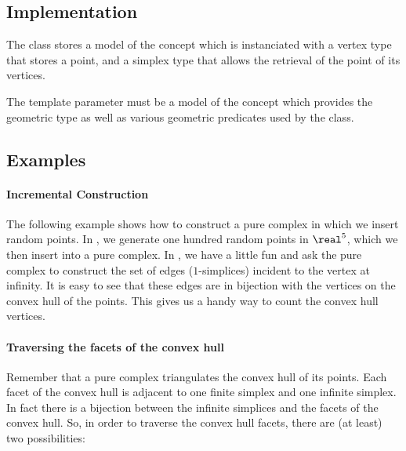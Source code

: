 {{%

\subsection{Implementation}

The class  stores a model 
of the concept  which is instanciated with a
vertex type that stores a point, and a simplex type that allows the retrieval
of the point of its vertices.

The template parameter  must be a model of the concept
 which provides the geometric  type as well
as various geometric predicates used by the  class.


\subsection{Examples}

\paragraph{Incremental Construction}

The following example shows how to construct a pure complex in which we insert
random points. In , we generate one hundred random points in
$\real^5$, which we then insert into a pure complex. In , we have
a little fun and ask the pure complex to construct the set of edges
($1$-simplices) incident to the vertex at infinity. It is easy to see that
these edges are in bijection with the vertices on the convex hull of the
points. This gives us a handy way to count the convex hull vertices.


\paragraph{Traversing the facets of the convex hull}

Remember that a pure complex triangulates the convex hull of its points. Each
facet of the convex hull is adjacent to one finite simplex and one infinite
simplex. In fact there is a bijection between the infinite simplices and the
facets of the convex hull. So, in order to traverse the convex hull facets,
there are (at least) two possibilities:

}}
